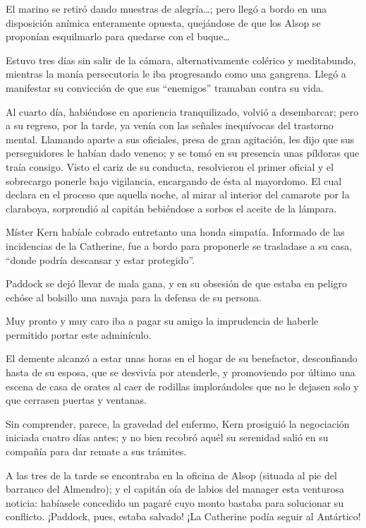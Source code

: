 \documentclass[10pt,twoside,openright]{memoir}
\begin{document}
El marino se retiró dando muestras de alegría\ldots; pero llegó a bordo en
una disposición anímica
enteramente
opuesta, quejándose de que los Alsop se proponían esquilmarlo para
quedarse con el buque\ldots

Estuvo tres días sin salir de la cámara, alternativamente colérico y
meditabundo, mientras la manía persecutoria le iba progresando como una
gangrena. Llegó a manifestar su convicción de que sus ``enemigos''
tramaban contra su vida.

Al cuarto día, habiéndose en apariencia tranquilizado, volvió a
desembarcar; pero a su regreso, por la tarde, ya venía con las señales
inequívocas del trastorno mental. Llamando aparte a sus oficiales, presa
de gran agitación, les dijo que sus perseguidores le habían dado veneno;
y se tomó en su presencia unas píldoras que traía consigo. Visto el
cariz de su conducta, resolvieron el primer oficial y el sobrecargo
ponerle bajo vigilancia, encargando de ésta al mayordomo. El cual
declara en el proceso que aquella noche, al mirar al interior del
camarote por la claraboya, sorprendió al capitán bebiéndose a sorbos el
aceite de la lámpara.

Míster Kern habíale cobrado entretanto una honda simpatía. Informado de
las incidencias de la Catherine, fue a bordo para proponerle se
trasladase a su casa, ``donde podría descansar y estar protegido''.

Paddock se dejó llevar de mala gana, y en su obsesión de que estaba en
peligro echóse al bolsillo una navaja para la defensa de su persona.

Muy pronto y muy caro iba a pagar su amigo la imprudencia de haberle
permitido portar este adminículo.

El demente alcanzó a estar unas horas en el hogar de su benefactor,
desconfiando hasta de su esposa, que se desvivía por atenderle, y
promoviendo por último una escena de casa de orates al caer de rodillas
implorándoles que no le dejasen solo y que cerrasen puertas y ventanas.

Sin comprender, parece, la gravedad del enfermo, Kern prosiguió la
negociación iniciada cuatro días antes; y no bien recobró aquél su
serenidad salió en su compañía para dar remate a sus trámites.

A las tres de la tarde se encontraba en la oficina de Alsop (situada al
pie del barranco del Almendro); y el
capitán oía de labios del manager esta venturosa noticia: habíasele
concedido un pagaré cuyo monto bastaba para solucionar su conflicto.
¡Paddock, pues, estaba salvado! ¡La Catherine podía seguir al Antártico!
\end{document}
